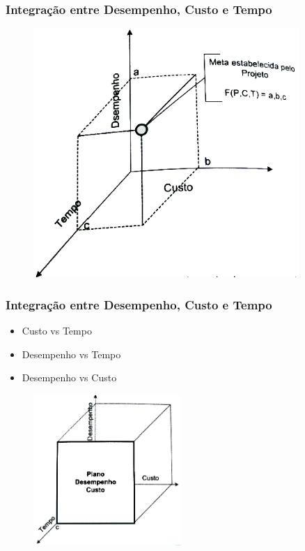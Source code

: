 \begin{frame}
 \frametitle{Integração entre Desempenho, Custo e Tempo}
   \begin{figure}
 \includegraphics[width = 0.9\textwidth]{figs/fig13.png}
\end{figure}
\end{frame}

\begin{frame}
 \frametitle{Integração entre Desempenho, Custo e Tempo}
 \begin{itemize}
  \item Custo vs Tempo
  \item Desempenho vs Tempo
  \item Desempenho vs Custo
 \end{itemize}

   \begin{figure}
 \includegraphics[width = 0.5\textwidth]{figs/fig14.png}
\end{figure}
\end{frame}

